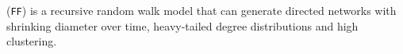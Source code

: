 		 \cite{leskovec2005graphs} (\texttt{FF}) is a recursive random walk model
		that can generate directed networks with shrinking diameter over time,
		heavy-tailed degree distributions and high clustering.

%
%
%
%
%
%
